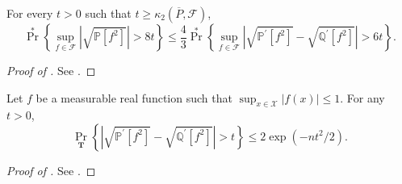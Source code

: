 \begin{lemma}
\label{lem--sqrt-ep-2nd-moment-ratio-symm-bound-1}
For every \(t > 0 \) such that \(t \geq \kappa_{2} \left( \overline{P},
\mathcal{F} \right)\),
\begin{equation}
  \Pr^{\ast} \left\{ \sup_{f \in \mathcal{F}} \left| \sqrt{\mathbb{P} \left[
  f^{2} \right]} \right| > 8 t \right\} \leq
  \frac{4}{3} \Pr^{\ast} \left\{ \sup_{f \in \mathcal{F}} \left|
  \sqrt{\mathbb{P}^{\prime} \left[ f^{2} \right]} - \sqrt{\mathbb{Q}^{\prime}
  \left[ f^{2} \right]} \right| > 6 t \right\}.
  \label{eqn--sqrt-ep-2nd-moment-ratio-symm-bound-1}
\end{equation}
\end{lemma}

\begin{proof}[Proof of ]
See .
\end{proof}

\begin{lemma}
\label{lem--sqrt-ep-2nd-moment-ratio-symm-single}
Let \(f\) be a measurable real function such that \(\sup_{x \in \mathcal{X}} |f
(x)| \leq 1\).
For any \(t > 0\),
\begin{equation}
  \Pr_{\mathbf{T}} \left\{ \left| \sqrt{\mathbb{P}^{\prime} \left[ f^{2}
  \right]} - \sqrt{\mathbb{Q}^{\prime} \left[ f^{2} \right]} \right| > t
  \right\} \leq 2 \exp \left( - n t^{2} / 2 \right).
  \label{eqn--sqrt-ep-2nd-moment-ratio-symm-single}
\end{equation}
\end{lemma}

\begin{proof}[Proof of ]
See .
\end{proof}


